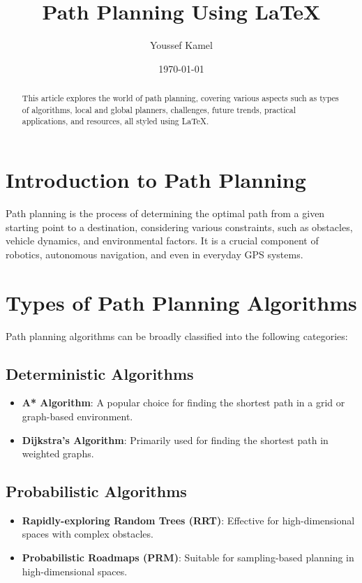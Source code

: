 \documentclass{article}
\title{Path Planning Using LaTeX}
\author{Youssef Kamel}
\date{\today}
\begin{document}
\maketitle

\begin{abstract}
    This article explores the world of path planning, covering various aspects such as types of algorithms, local and global planners, challenges, future trends, practical applications, and resources, all styled using LaTeX.
\end{abstract}

\section{Introduction to Path Planning}
Path planning is the process of determining the optimal path from a given starting point to a destination, considering various constraints, such as obstacles, vehicle dynamics, and environmental factors. It is a crucial component of robotics, autonomous navigation, and even in everyday GPS systems.

\section{Types of Path Planning Algorithms}
Path planning algorithms can be broadly classified into the following categories:

\subsection{Deterministic Algorithms}
\begin{itemize}
    \item \textbf{A* Algorithm}: A popular choice for finding the shortest path in a grid or graph-based environment.
    \item \textbf{Dijkstra's Algorithm}: Primarily used for finding the shortest path in weighted graphs.
\end{itemize}

\subsection{Probabilistic Algorithms}
\begin{itemize}
    \item \textbf{Rapidly-exploring Random Trees (RRT)}: Effective for high-dimensional spaces with complex obstacles.
    \item \textbf{Probabilistic Roadmaps (PRM)}: Suitable for sampling-based planning in high-dimensional spaces.
\end{itemize}
\end{document}
